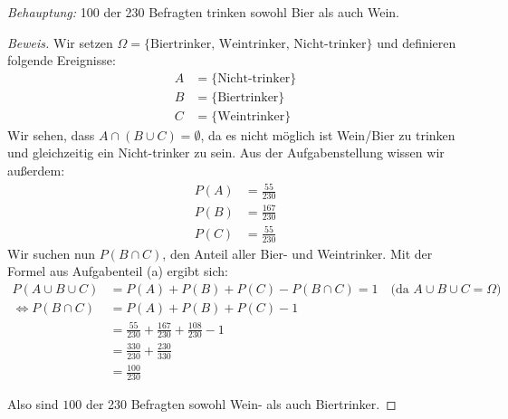 \documentclass[10pt]{article}
\begin{document}
\textit{Behauptung: } 100 der 230 Befragten trinken sowohl Bier als auch Wein.
\begin{proof}[Beweis]
Wir setzen $\Omega = \{\text{Biertrinker, Weintrinker, Nicht-trinker}\}$ und definieren folgende Ereignisse: 
\begin{align*}
    A &= \{\text{Nicht-trinker}\} \\
    B &= \{\text{Biertrinker}\} \\
    C &= \{\text{Weintrinker}\}
\end{align*}
Wir sehen, dass $A \cap (B \cup C) = \emptyset$, da es nicht möglich ist Wein/Bier zu trinken und gleichzeitig ein Nicht-trinker zu sein.
Aus der Aufgabenstellung wissen wir außerdem:
\begin{align*}
    P(A) &= \frac{55}{230} \\
    P(B) &= \frac{167}{230} \\
    P(C) &= \frac{55}{230}
\end{align*}
Wir suchen nun $P(B\cap C)$, den Anteil aller Bier- und Weintrinker. Mit der Formel aus Aufgabenteil (a) ergibt sich:
\begin{align*}
P(A \cup B \cup C) &= P(A) + P(B) + P(C) - P(B \cap C) = 1 \quad\text{(da $A\cup B\cup C = \Omega$)} \\
\Leftrightarrow P(B \cap C) &= P(A) + P(B) + P(C) - 1 \\
&= \frac{55}{230} + \frac{167}{230} + \frac{108}{230} - 1 \\
&= \frac{330}{230} + \frac{230}{330} \\
&= \frac{100}{230}
\end{align*}

Also sind $100$ der 230 Befragten sowohl Wein- als auch Biertrinker.

\end{proof}
\end{document}
